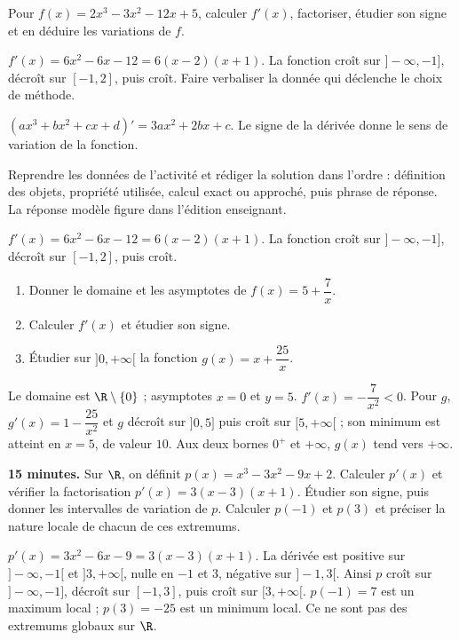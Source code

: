 \begin{activity}
Pour $f(x)=2x^3-3x^2-12x+5$, calculer $f'(x)$, factoriser, étudier son signe et en déduire les variations de $f$.

\end{activity}
\begin{solution}$f'(x)=6x^2-6x-12=6(x-2)(x+1)$. La fonction croît sur $]-\infty,-1]$, décroît sur $[-1,2]$, puis croît. Faire verbaliser la donnée qui déclenche le choix de méthode.\end{solution}

\begin{summary}$(ax^3+bx^2+cx+d)'=3ax^2+2bx+c$. Le signe de la dérivée donne le sens de variation de la fonction.\end{summary}

\begin{example}
Reprendre les données de l'activité et rédiger la solution dans l'ordre : définition des objets, propriété utilisée, calcul exact ou approché, puis phrase de réponse. La réponse modèle figure dans l'édition enseignant.
\end{example}
\begin{solution}$f'(x)=6x^2-6x-12=6(x-2)(x+1)$. La fonction croît sur $]-\infty,-1]$, décroît sur $[-1,2]$, puis croît.\end{solution}

\begin{exercise}[essentiel]
\begin{enumerate}\item Donner le domaine et les asymptotes de $f(x)=5+\dfrac{7}x$.\item Calculer $f'(x)$ et étudier son signe.\item Étudier sur $]0,+\infty[$ la fonction $g(x)=x+\dfrac{25}x$.\end{enumerate}
\end{exercise}
\begin{solution}Le domaine est $\R\setminus\{0\}$ ; asymptotes $x=0$ et $y=5$. $f'(x)=-\dfrac{7}{x^2}<0$. Pour $g$, $g'(x)=1-\dfrac{25}{x^2}$ et $g$ décroît sur $]0,5]$ puis croît sur $[5,+\infty[$ ; son minimum est atteint en $x=5$, de valeur $10$. Aux deux bornes $0^+$ et $+\infty$, $g(x)$ tend vers $+\infty$.\end{solution}


\begin{homework}\textbf{15 minutes.} Sur $\R$, on définit $p(x)=x^3-3x^2-9x+2$. Calculer $p'(x)$ et vérifier la factorisation $p'(x)=3(x-3)(x+1)$. Étudier son signe, puis donner les intervalles de variation de $p$. Calculer $p(-1)$ et $p(3)$ et préciser la nature locale de chacun de ces extremums.\end{homework}
\begin{solution}$p'(x)=3x^2-6x-9=3(x-3)(x+1)$. La dérivée est positive sur $]-\infty,-1[$ et $]3,+\infty[$, nulle en $-1$ et $3$, négative sur $]-1,3[$. Ainsi $p$ croît sur $]-\infty,-1]$, décroît sur $[-1,3]$, puis croît sur $[3,+\infty[$. $p(-1)=7$ est un maximum local ; $p(3)=-25$ est un minimum local. Ce ne sont pas des extremums globaux sur $\R$.\end{solution}

